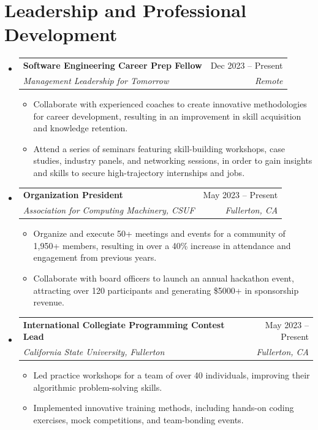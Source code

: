 \documentclass[letterpaper,11pt]{article}
\makeatletter
\newcommand{\resumeItem}[1]{
  \item\small{
    {#1 \vspace{-2pt}}
  }
}
\newcommand{\resumeSubheading}[4]{
  \vspace{-2pt}\item
    \begin{tabular*}{0.97\textwidth}[t]{l@{\extracolsep{\fill}}r}
      \textbf{#1} & #2 \\
      \textit{\small#3} & \textit{\small #4} \\
    \end{tabular*}\vspace{-7pt}
}
\newcommand{\resumeSubHeadingListStart}{\begin{itemize}[leftmargin=0.15in, label={}]}
\newcommand{\resumeSubHeadingListEnd}{\end{itemize}}
\newcommand{\resumeItemListStart}{\begin{itemize}}
\newcommand{\resumeItemListEnd}{\end{itemize}\vspace{-5pt}}
\makeatother
\begin{document}
  \section{Leadership and Professional Development}
  \resumeSubHeadingListStart
  \resumeSubheading
  {Software Engineering Career Prep Fellow}{Dec 2023 -- Present}
  {Management Leadership for Tomorrow}{Remote}
  \resumeItemListStart
  \resumeItem{Collaborate with experienced coaches to create innovative methodologies for career development, resulting in an improvement in skill acquisition and knowledge retention.}
  \resumeItem{Attend a series of seminars featuring skill-building workshops, case studies, industry panels, and networking sessions, in order to gain insights and skills to secure high-trajectory internships and jobs.}
  \resumeItemListEnd
  
  \resumeSubheading
  {Organization President}{May 2023 -- Present}
  {Association for Computing Machinery, CSUF}{Fullerton, CA}
  \resumeItemListStart
  \resumeItem{Organize and execute 50+ meetings and events for a community of 1,950+ members, resulting in over a 40\% increase in attendance and engagement from previous years.}
  \resumeItem{Collaborate with board officers to launch an annual hackathon event, attracting over 120 participants and generating \$5000+ in sponsorship revenue.}
  \resumeItemListEnd
  
  \resumeSubheading
  {International Collegiate Programming Contest Lead}{May 2023 -- Present}
  {California State University, Fullerton}{Fullerton, CA}
  \resumeItemListStart
  \resumeItem{Led practice workshops for a team of over 40 individuals, improving their algorithmic problem-solving skills.}
  \resumeItem{Implemented innovative training methods, including hands-on coding exercises, mock competitions, and team-bonding events.}
  \resumeItemListEnd
  \resumeSubHeadingListEnd
  
  
\end{document}
